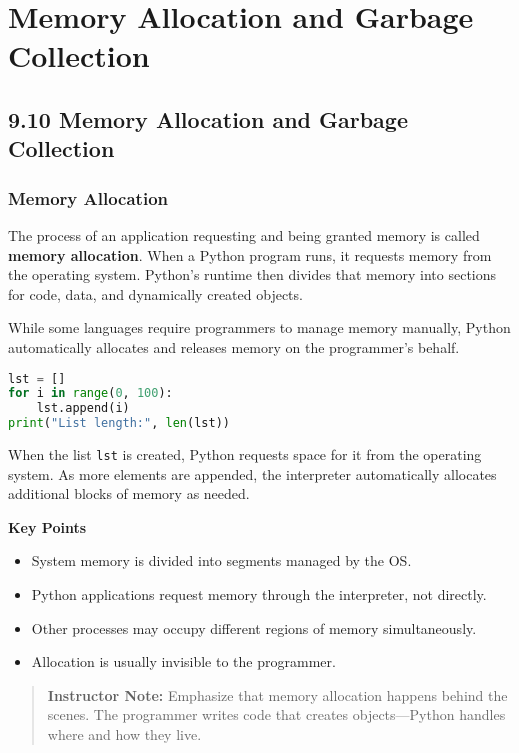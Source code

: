 \chapter{Memory Allocation and Garbage Collection}
\label{ch:memory_allocation_and_garbage_collection}

\section{9.10 Memory Allocation and Garbage Collection}

\subsection*{Memory Allocation}

The process of an application requesting and being granted memory is called
\textbf{memory allocation}.  
When a Python program runs, it requests memory from the operating system.
Python’s runtime then divides that memory into sections for code, data, and dynamically
created objects.

While some languages require programmers to manage memory manually,
Python automatically allocates and releases memory on the programmer’s behalf.

\begin{lstlisting}[language=Python, caption={Memory allocation in Python}]
lst = []
for i in range(0, 100):
    lst.append(i)
print("List length:", len(lst))
\end{lstlisting}

When the list \texttt{lst} is created, Python requests space for it from the operating
system. As more elements are appended, the interpreter automatically allocates additional
blocks of memory as needed.

\textbf{Key Points}
\begin{itemize}
  \item System memory is divided into segments managed by the OS.
  \item Python applications request memory through the interpreter, not directly.
  \item Other processes may occupy different regions of memory simultaneously.
  \item Allocation is usually invisible to the programmer.
\end{itemize}

\begin{quote}
\textbf{Instructor Note:} Emphasize that memory allocation happens behind the scenes.
The programmer writes code that creates objects—Python handles where and how they live.
\end{quote}

